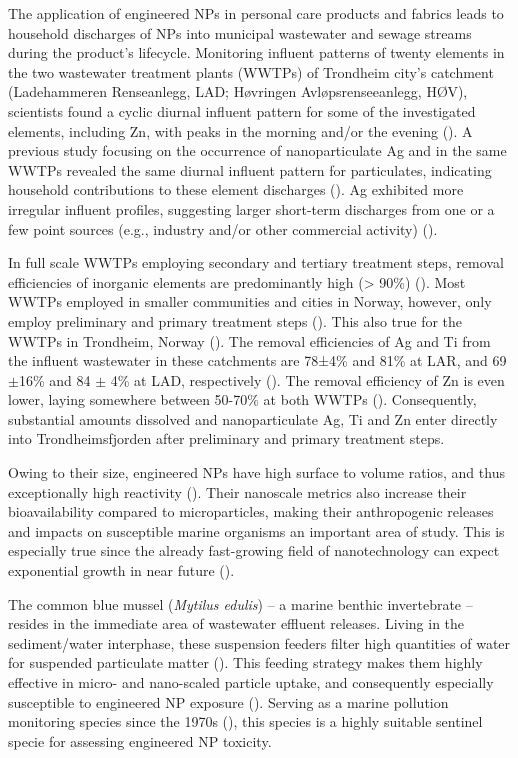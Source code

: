 The application of engineered NPs in personal care products and fabrics leads to household discharges of NPs into municipal wastewater and sewage streams during the product’s lifecycle. Monitoring influent patterns of twenty elements in the two wastewater treatment plants (WWTPs) of Trondheim city’s catchment (Ladehammeren Renseanlegg, LAD; Høvringen Avløpsrenseeanlegg, HØV), scientists found a cyclic diurnal influent pattern for some of the investigated elements, including Zn, with peaks in the morning and/or the evening (\cite{Farkas2020}). A previous study focusing on the occurrence of nanoparticulate Ag and  in the same WWTPs revealed the same diurnal influent pattern for  particulates, indicating household contributions to these element discharges (\cite{Polesel2018}). Ag exhibited more irregular influent profiles, suggesting larger short-term discharges from one or a few point sources (e.g., industry and/or other commercial activity) (\cite{Polesel2018}). 

In full scale WWTPs employing secondary and tertiary treatment steps, removal efficiencies of inorganic elements are predominantly high (> 90\%) (\cite{Cantinho2016}). Most WWTPs employed in smaller communities and cities in Norway, however, only employ preliminary and primary treatment steps (\cite{Berge2018}). This also true for the WWTPs in Trondheim, Norway (\cite{Farkas2020}). The removal efficiencies of Ag and Ti from the influent wastewater in these catchments are 78±4\% and 81\% at LAR, and 69$\pm$16\% and 84 $\pm$ 4\% at LAD, respectively (\cite{Polesel2018}). The removal efficiency of Zn is even lower, laying somewhere between 50-70\% at both WWTPs (\cite{Farkas2020}). Consequently, substantial amounts dissolved and nanoparticulate Ag, Ti and Zn enter directly into Trondheimsfjorden after preliminary and primary treatment steps. 

Owing to their size, engineered NPs have high surface to volume ratios, and thus exceptionally high reactivity (\cite{Warheit2018}). Their nanoscale metrics also increase their bioavailability compared to microparticles, making their anthropogenic releases and impacts on susceptible marine organisms an important area of study. This is especially true since the already fast-growing field of nanotechnology can expect exponential growth in near future (\cite{Talebian2021}). 

The common blue mussel (\emph{Mytilus edulis}) – a marine benthic invertebrate – resides in the immediate area of wastewater effluent releases. Living in the sediment/water interphase, these suspension feeders filter high quantities of water for suspended particulate matter (\cite{Beyer2017b}). This feeding strategy makes them highly effective in micro- and nano-scaled particle uptake, and consequently especially susceptible to engineered NP exposure (\cite{Canesi2012}). Serving as a marine pollution monitoring species since the 1970s (\cite{Goldberg1975}), this species is a highly suitable sentinel specie for assessing engineered NP toxicity.


